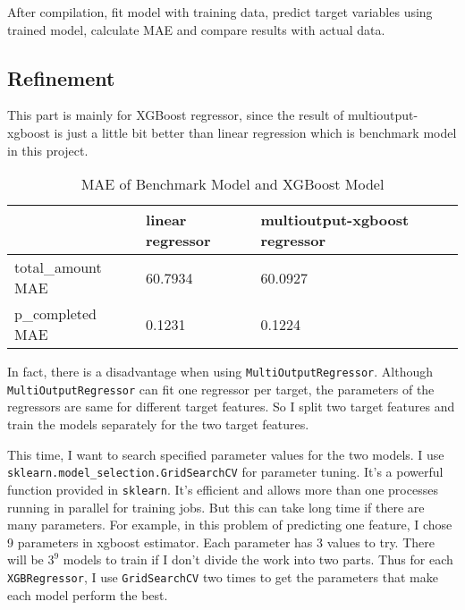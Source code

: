 \documentclass[a4paper,12pt]{article}
\begin{document}
After compilation, fit model with training data, predict target variables using trained model, calculate MAE and compare results 
with actual data.

\subsection*{Refinement}

This part is mainly for XGBoost regressor, since the result of multioutput-xgboost is just a little bit better than linear 
regression which is benchmark model in this project.

\begin{table}[H]
    \centering
    \begin{tabular}{|l|l|l|}
    \hline
                        & linear regressor  & multioutput-xgboost regressor \\
    \hline
    total\_amount MAE   & 60.7934           & 60.0927 \\
    \hline
    p\_completed  MAE   & 0.1231            & 0.1224 \\
    \hline
    \end{tabular}
    \caption{MAE of Benchmark Model and XGBoost Model}
\end{table}

In fact, there is a disadvantage when using \texttt{MultiOutputRegressor}. Although \texttt{MultiOutputRegressor} can fit one 
regressor per target, the parameters of the regressors are same for different target features. So I split two target features 
and train the models separately for the two target features. 

This time, I want to search specified parameter values for the two models. I use \texttt{sklearn.model\_selection.GridSearchCV} 
for parameter tuning. It's a powerful function provided in \texttt{sklearn}. It's efficient and allows more than one processes 
running in parallel for training jobs. But this can take long time if there are many parameters. For example, in this problem of 
predicting one feature, I chose 9 parameters in xgboost estimator. Each parameter has 3 values to try. There will be $3^9$ 
models to train if I don't divide the work into two parts. Thus for each \texttt{XGBRegressor}, I use \texttt{GridSearchCV} two 
times to get the parameters that make each model perform the best.
\end{document}
